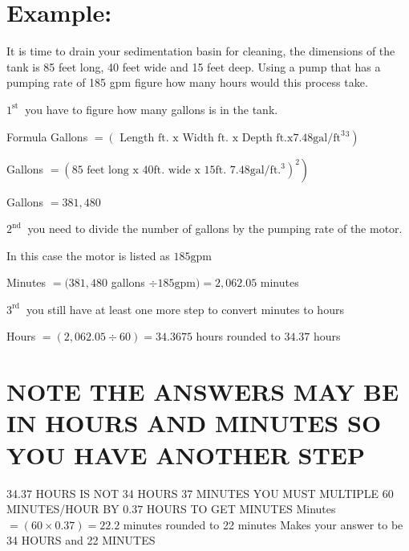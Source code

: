\documentclass[10pt]{article}
\begin{document}
\section{Example:}
It is time to drain your sedimentation basin for cleaning, the dimensions of the tank is 85 feet long, 40 feet wide and 15 feet deep. Using a pump that has a pumping rate of 185 gpm figure how many hours would this process take.

$1^{\text {st }}$ you have to figure how many gallons is in the tank.

Formula Gallons $=\left(\right.$ Length $\mathrm{ft}$. $\mathrm{x}$ Width $\mathrm{ft}$. $\mathrm{x}$ Depth $\left.\mathrm{ft} . \mathrm{x} 7.48 \mathrm{gal} / \mathrm{ft}^{3}{ }^{3}\right)$

Gallons $\left.=\left(85 \text { feet long x } 40 \mathrm{ft} \text {. wide x } 15 \mathrm{ft} \text {. } 7.48 \mathrm{gal} / \mathrm{ft} .^{3}\right)^{2}\right)$

Gallons $=381,480$

$2^{\text {nd }}$ you need to divide the number of gallons by the pumping rate of the motor.

In this case the motor is listed as $185 \mathrm{gpm}$

Minutes $=(381,480$ gallons $\div 185 \mathrm{gpm})=2,062.05$ minutes

$3^{\text {rd }}$ you still have at least one more step to convert minutes to hours

Hours $=(2,062.05 \div 60)=34.3675$ hours rounded to $34.37$ hours

\section{NOTE THE ANSWERS MAY BE IN HOURS AND MINUTES SO YOU HAVE ANOTHER STEP}
34.37 HOURS IS NOT 34 HOURS 37 MINUTES YOU MUST MULTIPLE 60 MINUTES/HOUR BY $0.37$ HOURS TO GET MINUTES Minutes $=(60 \times 0.37)=22.2$ minutes rounded to 22 minutes Makes your answer to be 34 HOURS and 22 MINUTES
\end{document}
